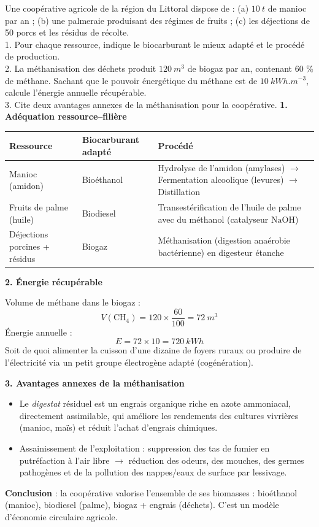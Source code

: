 \documentclass[11pt]{article}
\begin{document}
\begin{exoresolu}
Une coopérative agricole de la région du Littoral dispose de : (a) $\SI{10}{t}$ de manioc par an ; (b) une palmeraie produisant des régimes de fruits ; (c) les déjections de 50 porcs et les résidus de récolte.\\
1. Pour chaque ressource, indique le biocarburant le mieux adapté et le procédé de production.\\
2. La méthanisation des déchets produit $\SI{120}{m^3}$ de biogaz par an, contenant 60 \% de méthane. Sachant que le pouvoir énergétique du méthane est de $\SI{10}{kWh.m^{-3}}$, calcule l'énergie annuelle récupérable.\\
3. Cite deux avantages annexes de la méthanisation pour la coopérative.
\tcblower
\textbf{1. Adéquation ressource--filière}

\begin{center}
\begin{tabularx}{\linewidth}{|l|X|X|}
\hline
\rowcolor{popblueL} Ressource & Biocarburant adapté & Procédé \\
\hline
Manioc (amidon) & Bioéthanol & Hydrolyse de l'amidon (amylases) $\rightarrow$ Fermentation alcoolique (levures) $\rightarrow$ Distillation \\
\hline
Fruits de palme (huile) & Biodiesel & Transestérification de l'huile de palme avec du méthanol (catalyseur $\mathrm{NaOH}$) \\
\hline
Déjections porcines + résidus & Biogaz & Méthanisation (digestion anaérobie bactérienne) en digesteur étanche \\
\hline
\end{tabularx}
\end{center}

\textbf{2. Énergie récupérable}

Volume de méthane dans le biogaz :
\[ V(\mathrm{CH_4}) = 120 \times \dfrac{60}{100} = \SI{72}{m^3} \]
Énergie annuelle :
\[ E = 72 \times 10 = \SI{720}{kWh} \]
Soit de quoi alimenter la cuisson d'une dizaine de foyers ruraux ou produire de l'électricité via un petit groupe électrogène adapté (cogénération).

\textbf{3. Avantages annexes de la méthanisation}

\begin{itemize}
\item Le \emph{digestat} résiduel est un engrais organique riche en azote ammoniacal, directement assimilable, qui améliore les rendements des cultures vivrières (manioc, maïs) et réduit l'achat d'engrais chimiques.
\item Assainissement de l'exploitation : suppression des tas de fumier en putréfaction à l'air libre $\rightarrow$ réduction des odeurs, des mouches, des germes pathogènes et de la pollution des nappes/eaux de surface par lessivage.
\end{itemize}

\textbf{Conclusion} : la coopérative valorise l'ensemble de ses biomasses : bioéthanol (manioc), biodiesel (palme), biogaz + engrais (déchets). C'est un modèle d'économie circulaire agricole.
\end{exoresolu}
\end{document}
